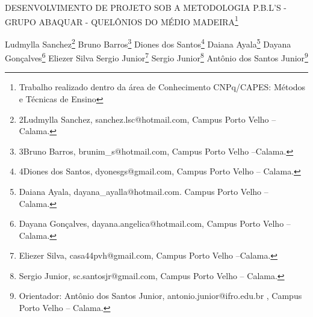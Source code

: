 \documentclass[article,12pt,onesidea,4paper,english,brazil]{abntex2}
\begin{document}
	
	
	\frenchspacing 
	
	\begin{center}
		\LARGE DESENVOLVIMENTO DE PROJETO SOB A METODOLOGIA P.B.L’S - GRUPO ABAQUAR - QUELÔNIOS DO MÉDIO MADEIRA\footnote{Trabalho realizado dentro da área de Conhecimento CNPq/CAPES: Métodos e Técnicas de Ensino}
		
		\normalsize
		Ludmylla Sanchez\footnote{2Ludmylla Sanchez, sanchez.lsc@hotmail.com, Campus Porto Velho –Calama.} 
		Bruno Barros\footnote{3Bruno Barros, brunim\_s@hotmail.com, Campus Porto Velho –Calama.} 
		Diones dos Santos\footnote{4Diones dos Santos, dyonesgs@gmail.com, Campus Porto Velho – Calama.} 
		Daiana Ayala\footnote{Daiana Ayala, dayana\_ayalla@hotmail.com. Campus Porto Velho – Calama.} 
		Dayana Gonçalves\footnote{Dayana Gonçalves, dayana.angelica@hotmail.com, Campus Porto Velho – Calama.}
		Eliezer Silva Sergio Junior\footnote{Eliezer Silva, casa44pvh@gmail.com, Campus Porto Velho –Calama.}
		Sergio Junior\footnote{Sergio Junior, sc.santosjr@gmail.com, Campus Porto Velho – Calama.}
		Antônio dos Santos Junior\footnote{Orientador: Antônio dos Santos Junior, antonio.junior@ifro.edu.br , Campus Porto Velho – Calama.}
	\end{center}
	
\end{document}
